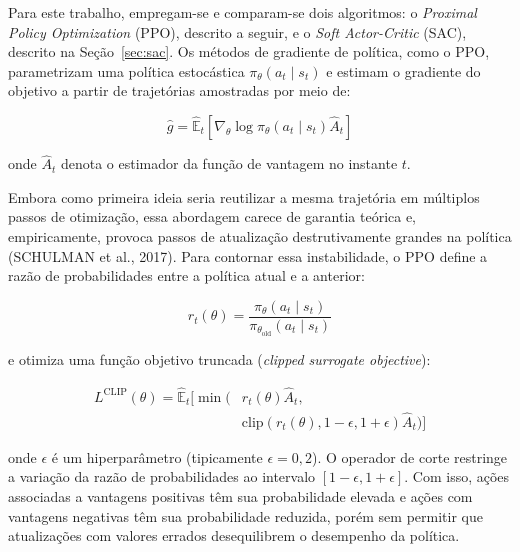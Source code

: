 \documentclass[conference]{IEEEtran}
\begin{document}
Para este trabalho, empregam-se e comparam-se dois algoritmos: o \textit{Proximal Policy Optimization} (PPO), descrito a seguir, e o \textit{Soft Actor-Critic} (SAC), descrito na Seção~\ref{sec:sac}. Os métodos de gradiente de política, como o PPO, parametrizam uma política estocástica $\pi_\theta(a_t \mid s_t)$ e estimam o gradiente do objetivo a partir de trajetórias amostradas por meio de:

\begin{equation}
    \hat{g} = \hat{\mathbb{E}}_t \left[ \nabla_\theta \log \pi_\theta(a_t \mid s_t) \hat{A}_t \right]
    \label{eq:policy_gradient}
\end{equation}

\noindent onde $\hat{A}_t$ denota o estimador da função de vantagem no instante $t$.

Embora como primeira ideia seria reutilizar a mesma trajetória em múltiplos passos de otimização, essa abordagem carece de garantia teórica e, empiricamente, provoca passos de atualização destrutivamente grandes na política (SCHULMAN et al., 2017). Para contornar essa instabilidade, o PPO define a razão de probabilidades entre a política atual e a anterior:

\begin{equation}
    r_t(\theta) = \frac{\pi_\theta(a_t \mid s_t)}{\pi_{\theta_{\text{old}}}(a_t \mid s_t)}
    \label{eq:ratio}
\end{equation}

\noindent e otimiza uma função objetivo truncada (\textit{clipped surrogate objective}):

\begin{equation}
    \begin{aligned}
        L^{\text{CLIP}}(\theta) = \hat{\mathbb{E}}_t \Big[ \min \big( & r_t(\theta)\hat{A}_t, \\
        & \text{clip}(r_t(\theta), 1-\epsilon, 1+\epsilon)\hat{A}_t \big) \Big]
    \end{aligned}
    \label{eq:ppo_clip}
\end{equation}

\noindent onde $\epsilon$ é um hiperparâmetro (tipicamente $\epsilon = 0{,}2$). O operador de corte restringe a variação da razão de probabilidades ao intervalo $[1-\epsilon, 1+\epsilon]$. Com isso, ações associadas a vantagens positivas têm sua probabilidade elevada e ações com vantagens negativas têm sua probabilidade reduzida, porém sem permitir que atualizações com valores errados desequilibrem o desempenho da política.
\end{document}
